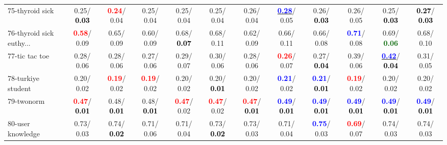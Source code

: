 \begin{table}[h]
\begin{center}
{\begin{tabular}{lc|c|c|c|c|c|c|c|c|c|c}
75-thyroid sick &   0.25/\textcolor{black}{\textbf{  0.03}} & \textcolor{red}{\textbf{  0.24}}/  0.04 &   0.25/  0.04 &   0.25/  0.04 &   0.25/  0.04 &   0.26/  0.04 & \underline{\textcolor{blue}{\textbf{  0.28}}}/  0.05 &   0.26/\textcolor{black}{\textbf{  0.03}} &   0.26/  0.05 &   0.25/\textcolor{black}{\textbf{  0.03}} & \textcolor{black}{\textbf{  0.27}}/\textcolor{black}{\textbf{  0.03}} \\
76-thyroid sick euthy... & \textcolor{red}{\textbf{  0.58}}/  0.09 &   0.65/  0.09 &   0.60/  0.09 &   0.68/\textcolor{black}{\textbf{  0.07}} &   0.68/  0.11 &   0.62/  0.09 &   0.66/  0.11 &   0.66/  0.08 & \textcolor{blue}{\textbf{  0.71}}/  0.08 &   0.69/\textcolor{darkgreen}{\textbf{  0.06}} &   0.68/  0.10 \\
77-tic tac toe &   0.28/  0.06 &   0.28/  0.06 &   0.27/  0.06 &   0.29/  0.07 &   0.30/  0.06 &   0.28/  0.06 & \textcolor{red}{\textbf{  0.26}}/  0.07 &   0.27/\textcolor{black}{\textbf{  0.04}} &   0.39/  0.06 & \underline{\textcolor{blue}{\textbf{  0.42}}}/\textcolor{black}{\textbf{  0.04}} &   0.31/  0.05 \\
78-turkiye student &   0.20/  0.02 & \textcolor{red}{\textbf{  0.19}}/  0.02 & \textcolor{red}{\textbf{  0.19}}/  0.02 &   0.20/  0.02 &   0.20/\textcolor{black}{\textbf{  0.01}} &   0.20/  0.02 & \textcolor{blue}{\textbf{  0.21}}/  0.02 & \textcolor{blue}{\textbf{  0.21}}/\textcolor{black}{\textbf{  0.01}} & \textcolor{red}{\textbf{  0.19}}/  0.02 &   0.20/  0.02 &   0.20/  0.02 \\ \hline
79-twonorm & \textcolor{red}{\textbf{  0.47}}/\textcolor{black}{\textbf{  0.01}} &   0.48/\textcolor{black}{\textbf{  0.01}} &   0.48/\textcolor{black}{\textbf{  0.01}} & \textcolor{red}{\textbf{  0.47}}/  0.02 & \textcolor{red}{\textbf{  0.47}}/  0.02 & \textcolor{red}{\textbf{  0.47}}/\textcolor{black}{\textbf{  0.01}} & \textcolor{blue}{\textbf{  0.49}}/\textcolor{black}{\textbf{  0.01}} & \textcolor{blue}{\textbf{  0.49}}/\textcolor{black}{\textbf{  0.01}} & \textcolor{blue}{\textbf{  0.49}}/\textcolor{black}{\textbf{  0.01}} & \textcolor{blue}{\textbf{  0.49}}/\textcolor{black}{\textbf{  0.01}} & \textcolor{blue}{\textbf{  0.49}}/\textcolor{black}{\textbf{  0.01}} \\
80-user knowledge &   0.73/  0.03 &   0.74/\textcolor{black}{\textbf{  0.02}} &   0.71/  0.06 &   0.71/  0.04 &   0.73/\textcolor{black}{\textbf{  0.02}} &   0.73/  0.03 &   0.71/  0.04 & \textcolor{blue}{\textbf{  0.75}}/  0.03 & \textcolor{red}{\textbf{  0.69}}/  0.07 &   0.74/  0.03 &   0.74/  0.03 \\

\end{tabular}}
\end{center}
\end{table}
